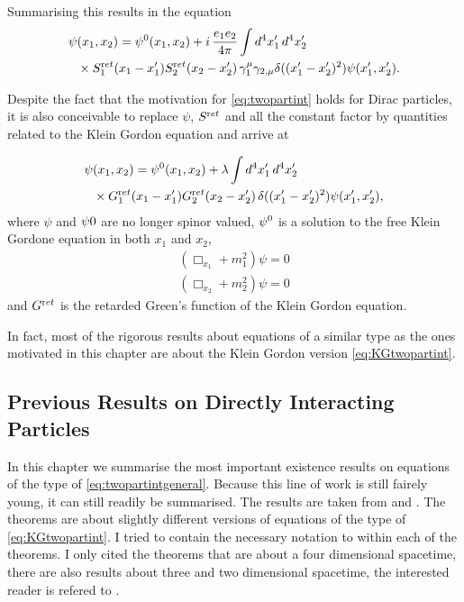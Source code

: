 \documentclass[b5paper,draft,openbib,12pt]{memoir}
\begin{document}
Summarising this results in the equation
\begin{align}\label{eq:twopartint}
  \psi&(x_1,x_2) = \psi^{0}(x_1,x_2)+i\, \frac{e_1e_2}{4\pi} \int d^4 x_1' \, d^4 x_2' \\\nonumber
  & \times S^{\textup ret}_1(x_1-x_1') S^{\textup ret}_2(x_2-x_2') \, \gamma_1^\mu \gamma_{2,\mu}\delta((x_1'-x_2')^2) \psi(x_1',x_2').
\end{align}


Despite the fact that the motivation for \eqref{eq:twopartint} holds for Dirac particles, 
it is also conceivable to replace \(\psi\), \(S^{\textup ret}\) and all the constant factor by 
quantities related to the Klein Gordon equation and arrive at 

\begin{align}\label{eq:KGtwopartint}
  \psi&(x_1,x_2) = \psi^{0}(x_1,x_2)+\lambda \int d^4 x_1' \, d^4 x_2' \\\nonumber
  & \times G^{\textup ret}_1(x_1-x_1') G^{\textup ret}_2(x_2-x_2') \,\delta((x_1'-x_2')^2) \psi(x_1',x_2'),
\end{align}
where \(\psi\) and \(\psi{0}\) are no longer spinor valued, \(\psi^{0}\) is a
solution to the free Klein Gordone equation in both \(x_1\) and \(x_2\),
\begin{align}
  (\Box_{x_1} + m_1^2)\psi=0\\
  (\Box_{x_2} + m_2^2)\psi=0
\end{align}
and \(G^{\textup ret}\) is the retarded Green's function of the Klein Gordon equation.

In fact,  most of the rigorous results about equations of a similar 
type as the ones motivated in this chapter are about the Klein 
Gordon version \eqref{eq:KGtwopartint}.


\subsection{Previous Results on Directly Interacting Particles}
In this chapter we summarise the most important existence results on equations of the type of 
\eqref{eq:twopartintgeneral}. Because this line of work is still fairely young,
it can still readily be summarised. The results are taken from \cite{lienertfirst} and 
\cite{lienertcurved}. The theorems are about slightly different versions of equations
of the type of \eqref{eq:KGtwopartint}. I tried to contain the necessary notation to within each
of the theorems. I only cited the theorems that are about a four dimensional spacetime, 
there are also results about three and two dimensional spacetime, the interested reader 
is refered to \cite{lienert2018direct,lienertcurved}. 
\end{document}
